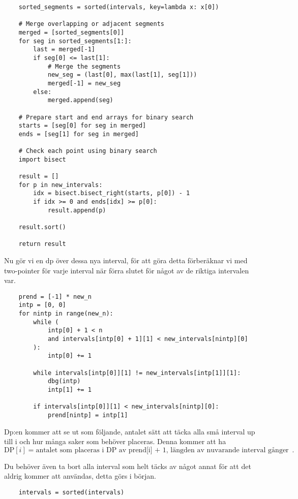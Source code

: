 \documentclass[a4paper, 12pt]{article}
\newenvironment{problem}[2][Problem]{\begin{trivlist}
\item[\hskip \labelsep {\bfseries #1}\hskip \labelsep {\bfseries #2.}]}{\end{trivlist}}
\begin{document}
\begin{problem}{1}
\begin{verbatim}
    sorted_segments = sorted(intervals, key=lambda x: x[0])

    # Merge overlapping or adjacent segments
    merged = [sorted_segments[0]]
    for seg in sorted_segments[1:]:
        last = merged[-1]
        if seg[0] <= last[1]:
            # Merge the segments
            new_seg = (last[0], max(last[1], seg[1]))
            merged[-1] = new_seg
        else:
            merged.append(seg)

    # Prepare start and end arrays for binary search
    starts = [seg[0] for seg in merged]
    ends = [seg[1] for seg in merged]

    # Check each point using binary search
    import bisect

    result = []
    for p in new_intervals:
        idx = bisect.bisect_right(starts, p[0]) - 1
        if idx >= 0 and ends[idx] >= p[0]:
            result.append(p)

    result.sort()

    return result

    \end{verbatim}

    Nu gör vi en dp över dessa nya interval, för att göra detta förberäknar vi med two-pointer för varje interval när förra slutet för något av de riktiga intervalen var.

    \begin{verbatim}
    prend = [-1] * new_n
    intp = [0, 0]
    for nintp in range(new_n):
        while (
            intp[0] + 1 < n
            and intervals[intp[0] + 1][1] < new_intervals[nintp][0]
        ):
            intp[0] += 1

        while intervals[intp[0]][1] != new_intervals[intp[1]][1]:
            dbg(intp)
            intp[1] += 1

        if intervals[intp[0]][1] < new_intervals[nintp][0]:
            prend[nintp] = intp[1]
    \end{verbatim}

    Dp:en kommer att se ut som följande, antalet sätt att täcka alla små interval up till i och hur många saker som behöver placeras. Denna kommer att ha \[
    \text{DP}[i] = {\text{antalet som placeras i DP av prend[i] + 1, längden av nuvarande interval gånger svaret för de föregående som kan placeras}}.
    \]

    Du behöver även ta bort alla interval som helt täcks av något annat för att det aldrig kommer att användas, detta görs i början.
    \begin{verbatim}
    intervals = sorted(intervals)


\end{verbatim}
\end{problem}
\end{document}
